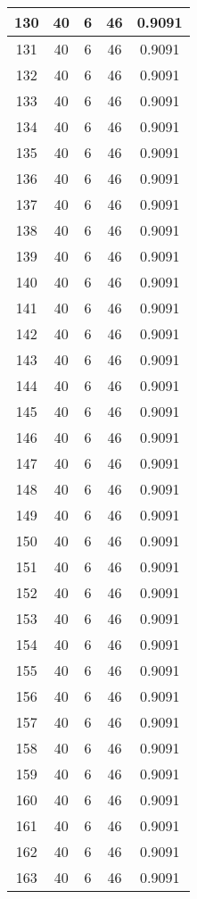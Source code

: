 \documentclass[letterpaper, 12pt]{article}
\begin{document}
\begin{longtable}{|c|c|c|c|c|}
\hline
130 & 40 & 6 & 46 & 0.9091 \\
\hline
131 & 40 & 6 & 46 & 0.9091 \\
\hline
132 & 40 & 6 & 46 & 0.9091 \\
\hline
133 & 40 & 6 & 46 & 0.9091 \\
\hline
134 & 40 & 6 & 46 & 0.9091 \\
\hline
135 & 40 & 6 & 46 & 0.9091 \\
\hline
136 & 40 & 6 & 46 & 0.9091 \\
\hline
137 & 40 & 6 & 46 & 0.9091 \\
\hline
138 & 40 & 6 & 46 & 0.9091 \\
\hline
139 & 40 & 6 & 46 & 0.9091 \\
\hline
140 & 40 & 6 & 46 & 0.9091 \\
\hline
141 & 40 & 6 & 46 & 0.9091 \\
\hline
142 & 40 & 6 & 46 & 0.9091 \\
\hline
143 & 40 & 6 & 46 & 0.9091 \\
\hline
144 & 40 & 6 & 46 & 0.9091 \\
\hline
145 & 40 & 6 & 46 & 0.9091 \\
\hline
146 & 40 & 6 & 46 & 0.9091 \\
\hline
147 & 40 & 6 & 46 & 0.9091 \\
\hline
148 & 40 & 6 & 46 & 0.9091 \\
\hline
149 & 40 & 6 & 46 & 0.9091 \\
\hline
150 & 40 & 6 & 46 & 0.9091 \\
\hline
151 & 40 & 6 & 46 & 0.9091 \\
\hline
152 & 40 & 6 & 46 & 0.9091 \\
\hline
153 & 40 & 6 & 46 & 0.9091 \\
\hline
154 & 40 & 6 & 46 & 0.9091 \\
\hline
155 & 40 & 6 & 46 & 0.9091 \\
\hline
156 & 40 & 6 & 46 & 0.9091 \\
\hline
157 & 40 & 6 & 46 & 0.9091 \\
\hline
158 & 40 & 6 & 46 & 0.9091 \\
\hline
159 & 40 & 6 & 46 & 0.9091 \\
\hline
160 & 40 & 6 & 46 & 0.9091 \\
\hline
161 & 40 & 6 & 46 & 0.9091 \\
\hline
162 & 40 & 6 & 46 & 0.9091 \\
\hline
163 & 40 & 6 & 46 & 0.9091 \\

\end{longtable}
\end{document}

